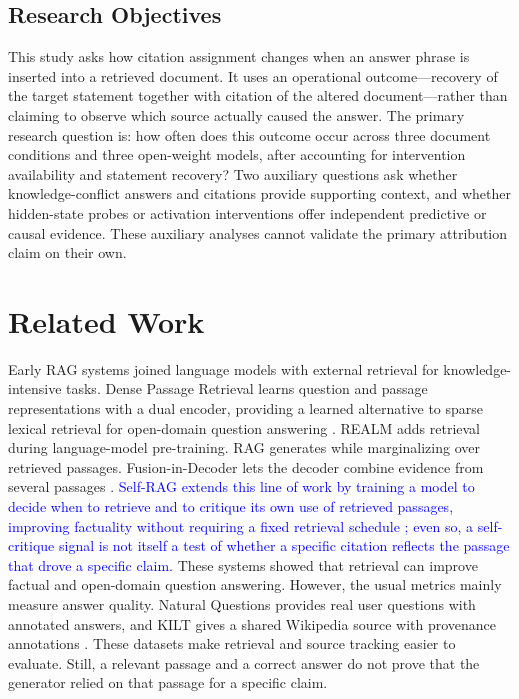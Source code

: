 \documentclass[a4paper,fleqn]{cas-sc}
\begin{document}
\subsection{Research Objectives}
\label{subsec:objectives}

\color{blue}
This study asks how citation assignment changes when an answer phrase is inserted into a retrieved document. It uses an operational outcome---recovery of the target statement together with citation of the altered document---rather than claiming to observe which source actually caused the answer. The primary research question is: how often does this outcome occur across three document conditions and three open-weight models, after accounting for intervention availability and statement recovery? Two auxiliary questions ask whether knowledge-conflict answers and citations provide supporting context, and whether hidden-state probes or activation interventions offer independent predictive or causal evidence. These auxiliary analyses cannot validate the primary attribution claim on their own.
\color{black}

\section{Related Work}
\label{sec:related-work}

Early RAG systems joined language models with external retrieval for knowledge-intensive tasks. Dense Passage Retrieval learns question and passage representations with a dual encoder, providing a learned alternative to sparse lexical retrieval for open-domain question answering \cite{karpukhin2020dpr}. REALM adds retrieval during language-model pre-training. RAG generates while marginalizing over retrieved passages. Fusion-in-Decoder lets the decoder combine evidence from several passages \cite{guu2020realm,lewis2020rag,izacard2021fid}. \textcolor{blue}{Self-RAG extends this line of work by training a model to decide when to retrieve and to critique its own use of retrieved passages, improving factuality without requiring a fixed retrieval schedule \cite{asai2024selfrag}; even so, a self-critique signal is not itself a test of whether a specific citation reflects the passage that drove a specific claim.} These systems showed that retrieval can improve factual and open-domain question answering. However, the usual metrics mainly measure answer quality. Natural Questions provides real user questions with annotated answers, and KILT gives a shared Wikipedia source with provenance annotations \cite{kwiatkowski2019natural,petroni2021kilt}. These datasets make retrieval and source tracking easier to evaluate. Still, a relevant passage and a correct answer do not prove that the generator relied on that passage for a specific claim.
\end{document}
